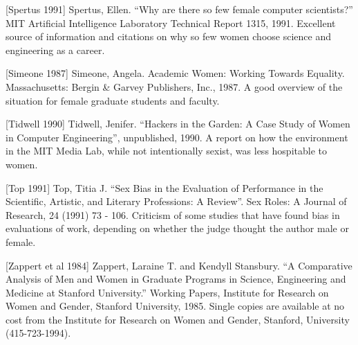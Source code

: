 {[Spertus 1991]     Spertus, Ellen. ``Why are there so few female
computer scientists?''  MIT Artificial Intelligence Laboratory Technical
Report 1315, 1991.  Excellent source of information and citations
on why so few women choose science and engineering as a career.


[Simeone 1987]      Simeone,      Angela.     Academic
                    Women:  Working Towards Equality.
                    Massachusetts: Bergin \& Garvey Publishers, Inc., 1987. A good overview of
                    the situation for female graduate students
                    and faculty.



[Tidwell 1990]      Tidwell, Jenifer. ``Hackers in the Garden: A Case Study of Women in Computer Engineering'', unpublished, 1990.
                    A report on how the environment in the
                    MIT Media Lab, while not intentionally
                    sexist, was less hospitable to women.

[Top 1991]          Top, Titia J. ``Sex Bias in the Evaluation of Performance in the Scientific,
                    Artistic, and Literary Professions:  A
                    Review''. Sex Roles: A Journal of Research, 24 (1991) 73 - 106. Criticism of
                    some studies that have found bias in evaluations of work, depending on whether the
                    judge thought the author male or female.


[Zappert et al 1984] Zappert,  Laraine  T.  and  Kendyll
                    Stansbury.  ``A  Comparative  Analysis  of  Men  and  Women  in  Graduate Programs in Science, Engineering
                    and Medicine at Stanford University.''
                    Working Papers, Institute for Research
                    on Women and Gender, Stanford University, 1985. Single copies are available
                    at no cost from the Institute for Research
                    on Women and Gender, Stanford, University (415-723-1994).

}



\bye





